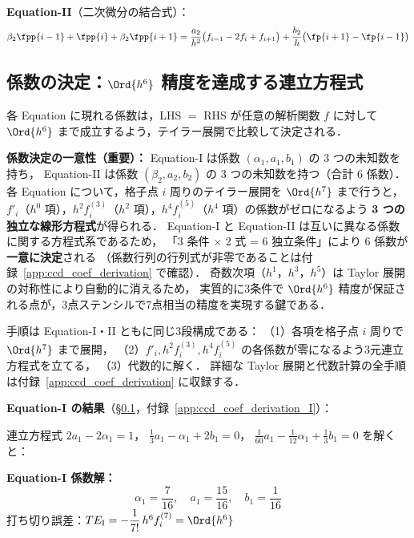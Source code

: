 \noindent\textbf{Equation-II}（二次微分の結合式）：
\begin{equation}
  \beta_2\fpp{i-1} + \fpp{i} + \beta_2\fpp{i+1}
  = \frac{a_2}{h^2}\bigl(f_{i-1}-2f_i+f_{i+1}\bigr)
  + \frac{b_2}{h}\bigl(\fp{i+1}-\fp{i-1}\bigr)
  \label{eq:CCD_II}
\end{equation}

\subsection{係数の決定：\texorpdfstring{$\Ord{h^6}$}{O(h\^{}6)} 精度を達成する連立方程式}
\label{sec:ccd_te_I}

各 Equation に現れる係数は，LHS $=$ RHS が任意の解析関数 $f$ に対して
$\Ord{h^6}$ まで成立するよう，テイラー展開で比較して決定される．

\noindent\textbf{係数決定の一意性（重要）：}
Equation-I は係数 $(\alpha_1, a_1, b_1)$ の 3 つの未知数を持ち，
Equation-II は係数 $(\beta_2, a_2, b_2)$ の 3 つの未知数を持つ（合計 6 係数）．
各 Equation について，格子点 $i$ 周りのテイラー展開を $\Ord{h^7}$ まで行うと，
$f'_i$（$h^0$ 項），$h^2 f^{(3)}_i$（$h^2$ 項），$h^4 f^{(5)}_i$（$h^4$ 項）の係数がゼロになるよう
\textbf{3 つの独立な線形方程式}が得られる．
Equation-I と Equation-II は互いに異なる係数に関する方程式系であるため，
「3 条件 × 2 式 = 6 独立条件」により 6 係数が\textbf{一意に決定}される
（係数行列の行列式が非零であることは付録~\ref{app:ccd_coef_derivation} で確認）．
奇数次項（$h^1$，$h^3$，$h^5$）は Taylor 展開の対称性により自動的に消えるため，
実質的に3条件で $\Ord{h^6}$ 精度が保証される点が，3点ステンシルで7点相当の精度を実現する鍵である．

手順は Equation-I・II ともに同じ3段構成である：
（1）各項を格子点 $i$ 周りで $\Ord{h^7}$ まで展開，
（2）$f'_i, h^2 f^{(3)}_i, h^4 f^{(5)}_i$ の各係数が零になるよう3元連立方程式を立てる，
（3）代数的に解く．
詳細な Taylor 展開と代数計算の全手順は付録~\ref{app:ccd_coef_derivation} に収録する．

\textbf{Equation-I の結果}（§\ref{sec:ccd_te_I}，付録~\ref{app:ccd_coef_derivation_I}）：

連立方程式
$2a_1 - 2\alpha_1 = 1$，
$\tfrac{1}{3}a_1 - \alpha_1 + 2b_1 = 0$，
$\tfrac{1}{60}a_1 - \tfrac{1}{12}\alpha_1 + \tfrac{1}{3}b_1 = 0$
を解くと：

\begin{tcolorbox}[resultbox]
\textbf{Equation-I 係数解：}
\begin{equation}
  \boxed{
    \alpha_1 = \frac{7}{16},\quad
    a_1 = \frac{15}{16},\quad
    b_1 = \frac{1}{16}
  }
\end{equation}
打ち切り誤差：$TE_{\mathrm{I}} = -\dfrac{1}{7!}\,h^6 f^{(7)}_i = \Ord{h^6}$
\label{eq:CCD_TE}
\end{tcolorbox}

